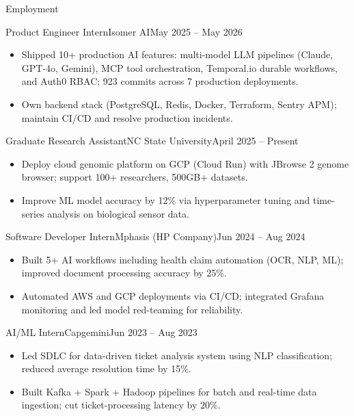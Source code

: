 \documentclass[]{mcdowellcv}
\begin{document}
\makeheader

\begin{cvsection}{Employment}
  \begin{cvsubsection}{Product Engineer Intern}{Isomer AI}{May 2025 -- May 2026}
    \begin{itemize}
      \item Shipped 10+ production AI features: multi-model LLM pipelines (Claude, GPT-4o, Gemini), MCP tool orchestration, Temporal.io durable workflows, and Auth0 RBAC; 923 commits across 7 production deployments.
      \item Own backend stack (PostgreSQL, Redis, Docker, Terraform, Sentry APM); maintain CI/CD and resolve production incidents.
    \end{itemize}
    \vspace{-1.5pt}
  \end{cvsubsection}

  \begin{cvsubsection}{Graduate Research Assistant}{NC State University}{April 2025 -- Present}
    \begin{itemize}
      \item Deploy cloud genomic platform on GCP (Cloud Run) with JBrowse 2 genome browser; support 100+ researchers, 500GB+ datasets.
      \item Improve ML model accuracy by 12\% via hyperparameter tuning and time-series analysis on biological sensor data.
    \end{itemize}
    \vspace{-1.5pt}
  \end{cvsubsection}

  \begin{cvsubsection}{Software Developer Intern}{Mphasis (HP Company)}{Jun 2024 -- Aug 2024}
    \begin{itemize}
      \item Built 5+ AI workflows including health claim automation (OCR, NLP, ML); improved document processing accuracy by 25\%.
      \item Automated AWS and GCP deployments via CI/CD; integrated Grafana monitoring and led model red-teaming for reliability.
    \end{itemize}
    \vspace{-1.5pt}
  \end{cvsubsection}

  \begin{cvsubsection}{AI/ML Intern}{Capgemini}{Jun 2023 -- Aug 2023}
    \begin{itemize}
      \item Led SDLC for data-driven ticket analysis system using NLP classification; reduced average resolution time by 15\%.
      \item Built Kafka + Spark + Hadoop pipelines for batch and real-time data ingestion; cut ticket-processing latency by 20\%.
    \end{itemize}
    \vspace{-1.5pt}
  \end{cvsubsection}
\end{cvsection}
\end{document}
